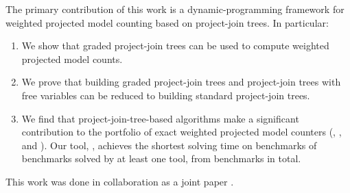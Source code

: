 The primary contribution of this work is a dynamic-programming framework for weighted projected model counting based on project-join trees. In particular:
\begin{enumerate}
    \item We show that graded project-join trees can be used to compute weighted projected model counts.
    \item We prove that building graded project-join trees and project-join trees with free variables can be reduced to building standard project-join trees.
    \item We find that project-join-tree-based algorithms make a significant contribution to the portfolio of exact weighted projected model counters (\dfp{}, \projmc{}, and \ssat{}).
    Our tool, \procount{}, achieves the shortest solving time on \dpmcFastestBenchmarks{} benchmarks of \solvedBenchmarks{} benchmarks solved by at least one tool, from \benchmarks{} benchmarks in total.
\end{enumerate}

This work was done in collaboration as a joint paper \cite{dudek2020procount}.
